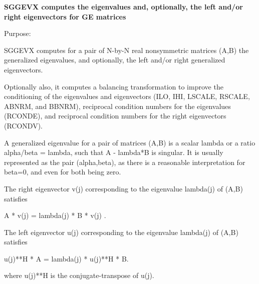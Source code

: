 {\bfseries  S\+G\+G\+E\+V\+X computes the eigenvalues and, optionally, the left and/or right eigenvectors for G\+E matrices} 

 \begin{DoxyParagraph}{Purpose\+: }
\begin{DoxyVerb} SGGEVX computes for a pair of N-by-N real nonsymmetric matrices (A,B)
 the generalized eigenvalues, and optionally, the left and/or right
 generalized eigenvectors.

 Optionally also, it computes a balancing transformation to improve
 the conditioning of the eigenvalues and eigenvectors (ILO, IHI,
 LSCALE, RSCALE, ABNRM, and BBNRM), reciprocal condition numbers for
 the eigenvalues (RCONDE), and reciprocal condition numbers for the
 right eigenvectors (RCONDV).

 A generalized eigenvalue for a pair of matrices (A,B) is a scalar
 lambda or a ratio alpha/beta = lambda, such that A - lambda*B is
 singular. It is usually represented as the pair (alpha,beta), as
 there is a reasonable interpretation for beta=0, and even for both
 being zero.

 The right eigenvector v(j) corresponding to the eigenvalue lambda(j)
 of (A,B) satisfies

                  A * v(j) = lambda(j) * B * v(j) .

 The left eigenvector u(j) corresponding to the eigenvalue lambda(j)
 of (A,B) satisfies

                  u(j)**H * A  = lambda(j) * u(j)**H * B.

 where u(j)**H is the conjugate-transpose of u(j).\end{DoxyVerb}
 
\end{DoxyParagraph}


